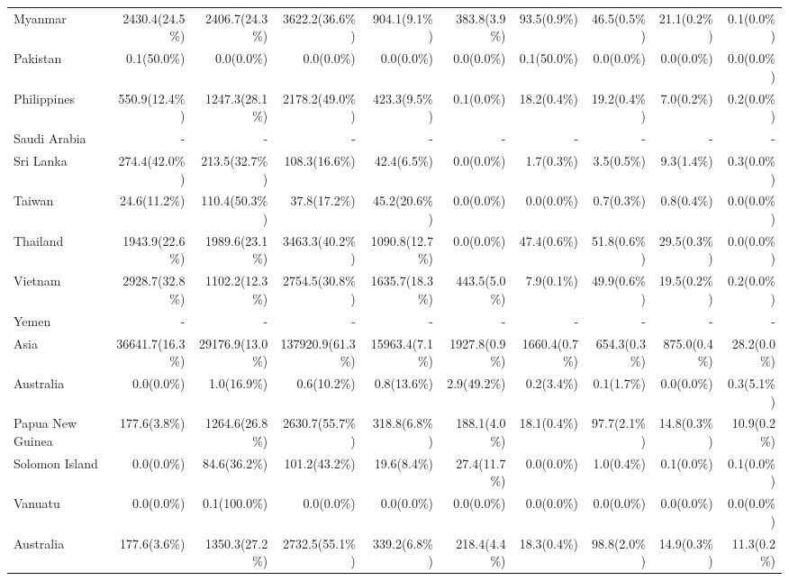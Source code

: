 \begin{scriptsize}
\begin{landscape}
\begin{center}
\begin{longtable}[ht]{lrrrrrrrrr}
			Myanmar&2430.4(24.5\%)&2406.7(24.3\%)&3622.2(36.6\%)&904.1(9.1\%)&383.8(3.9\%)&93.5(0.9\%)&46.5(0.5\%)&21.1(0.2\%)&0.1(0.0\%)\\
			Pakistan&0.1(50.0\%)&0.0(0.0\%)&0.0(0.0\%)&0.0(0.0\%)&0.0(0.0\%)&0.1(50.0\%)&0.0(0.0\%)&0.0(0.0\%)&0.0(0.0\%)\\
			Philippines&550.9(12.4\%)&1247.3(28.1\%)&2178.2(49.0\%)&423.3(9.5\%)&0.1(0.0\%)&18.2(0.4\%)&19.2(0.4\%)&7.0(0.2\%)&0.2(0.0\%)\\
			Saudi Arabia&-&-&-&-&-&-&-&-&-\\
			Sri Lanka&274.4(42.0\%)&213.5(32.7\%)&108.3(16.6\%)&42.4(6.5\%)&0.0(0.0\%)&1.7(0.3\%)&3.5(0.5\%)&9.3(1.4\%)&0.3(0.0\%)\\
			Taiwan&24.6(11.2\%)&110.4(50.3\%)&37.8(17.2\%)&45.2(20.6\%)&0.0(0.0\%)&0.0(0.0\%)&0.7(0.3\%)&0.8(0.4\%)&0.0(0.0\%)\\
			Thailand&1943.9(22.6\%)&1989.6(23.1\%)&3463.3(40.2\%)&1090.8(12.7\%)&0.0(0.0\%)&47.4(0.6\%)&51.8(0.6\%)&29.5(0.3\%)&0.0(0.0\%)\\
			Vietnam&2928.7(32.8\%)&1102.2(12.3\%)&2754.5(30.8\%)&1635.7(18.3\%)&443.5(5.0\%)&7.9(0.1\%)&49.9(0.6\%)&19.5(0.2\%)&0.2(0.0\%)\\
			Yemen&-&-&-&-&-&-&-&-&-\\\hline
			Asia&36641.7(16.3\%)&29176.9(13.0\%)&137920.9(61.3\%)&15963.4(7.1\%)&1927.8(0.9\%)&1660.4(0.7\%)&654.3(0.3\%)&875.0(0.4\%)&28.2(0.0\%)\\\hline
			Australia&0.0(0.0\%)&1.0(16.9\%)&0.6(10.2\%)&0.8(13.6\%)&2.9(49.2\%)&0.2(3.4\%)&0.1(1.7\%)&0.0(0.0\%)&0.3(5.1\%)\\
			Papua New Guinea&177.6(3.8\%)&1264.6(26.8\%)&2630.7(55.7\%)&318.8(6.8\%)&188.1(4.0\%)&18.1(0.4\%)&97.7(2.1\%)&14.8(0.3\%)&10.9(0.2\%)\\
			Solomon Island&0.0(0.0\%)&84.6(36.2\%)&101.2(43.2\%)&19.6(8.4\%)&27.4(11.7\%)&0.0(0.0\%)&1.0(0.4\%)&0.1(0.0\%)&0.1(0.0\%)\\
			Vanuatu&0.0(0.0\%)&0.1(100.0\%)&0.0(0.0\%)&0.0(0.0\%)&0.0(0.0\%)&0.0(0.0\%)&0.0(0.0\%)&0.0(0.0\%)&0.0(0.0\%)\\\hline
			Australia&177.6(3.6\%)&1350.3(27.2\%)&2732.5(55.1\%)&339.2(6.8\%)&218.4(4.4\%)&18.3(0.4\%)&98.8(2.0\%)&14.9(0.3\%)&11.3(0.2\%)\\
			\end{longtable}
		\end{center}
	\end{landscape}
\end{scriptsize}
